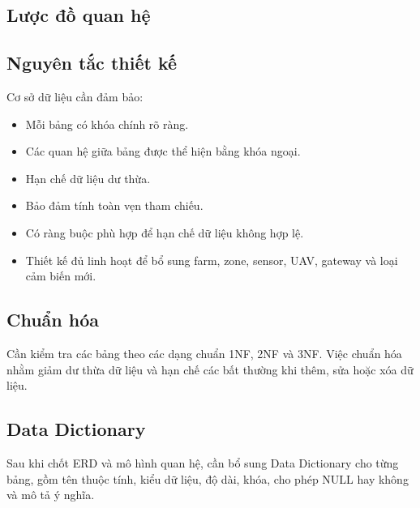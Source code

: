\subsection{Lược đồ quan hệ}

\subsection{Nguyên tắc thiết kế}
Cơ sở dữ liệu cần đảm bảo:
\begin{itemize}
    \item Mỗi bảng có khóa chính rõ ràng.
    \item Các quan hệ giữa bảng được thể hiện bằng khóa ngoại.
    \item Hạn chế dữ liệu dư thừa.
    \item Bảo đảm tính toàn vẹn tham chiếu.
    \item Có ràng buộc phù hợp để hạn chế dữ liệu không hợp lệ.
    \item Thiết kế đủ linh hoạt để bổ sung farm, zone, sensor, UAV, gateway và loại cảm biến mới.
\end{itemize}


\subsection{Chuẩn hóa}
Cần kiểm tra các bảng theo các dạng chuẩn 1NF, 2NF và 3NF. Việc chuẩn hóa nhằm giảm dư thừa dữ liệu và hạn chế các bất thường khi thêm, sửa hoặc xóa dữ liệu.

\subsection{Data Dictionary}
Sau khi chốt ERD và mô hình quan hệ, cần bổ sung Data Dictionary cho từng bảng, gồm tên thuộc tính, kiểu dữ liệu, độ dài, khóa, cho phép NULL hay không và mô tả ý nghĩa.

